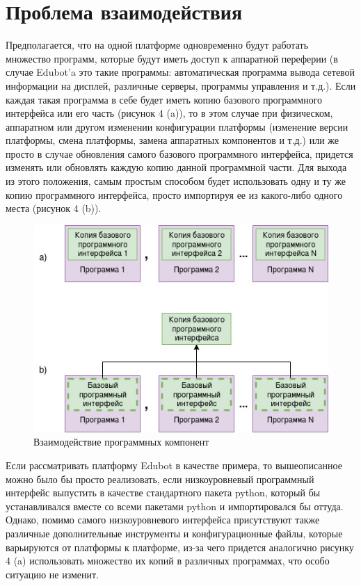 \documentclass[a4paper,12pt]{article}
\begin{document}
\section{Проблема взаимодействия}
Предполагается, что на одной платформе одновременно будут работать множество программ, которые будут иметь доступ к аппаратной переферии (в случае Edubot'a это такие программы: автоматическая программа вывода сетевой информации на дисплей, различные серверы, программы управления и т.д.). Если каждая такая программа в себе будет иметь копию базового программного интерфейса или его часть (рисунок 4 (a)), то в этом случае при физическом, аппаратном или другом изменении конфигурации платформы (изменение версии платформы, смена платформы, замена аппаратных компонентов и т.д.) или же просто в случае обновления самого базового программного интерфейса, придется изменять или обновлять каждую копию данной программной части. Для выхода из этого положения, самым простым способом будет использовать одну и ту же копию программного интерфейса, просто импортируя ее из какого-либо одного места (рисунок 4 (b)).

\begin{figure}[h!]
\centering
\includegraphics[scale=0.8]{interaction.jpg}
\caption{Взаимодействие программных компонент}
\label{fig:interaction}
\end{figure}

Если рассматривать платформу Edubot в качестве примера, то вышеописанное можно было бы просто реализовать, если низкоуровневый программный интерфейс выпустить в качестве стандартного пакета python, который бы устанавливался вместе со всеми пакетами python и импортировался бы оттуда. Однако, помимо самого низкоуровневого интерфейса присутствуют также различные дополнительные инструменты и конфигурационные файлы, которые варьируются от платформы к платформе, из-за чего придется аналогично рисунку 4 (a) использовать множество их копий в различных программах, что особо ситуацию не изменит.  
\end{document}
